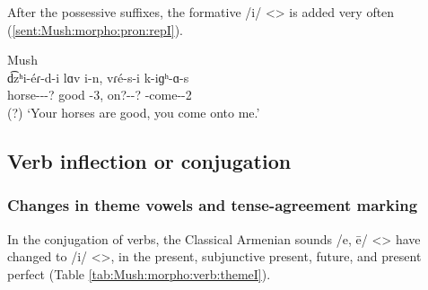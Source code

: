 After the possessive suffixes, the formative /i/ <> is added very often (\ref{sent:Mush:morpho:pron:repI}).

\begin{exe}
	\ex Mush \label{sent:Mush:morpho:pron:repI} \\ \gll 
	d͡zʰi-\'eɾ-d-i lɑv i-n, vɾ\'e-s-i k-iɡʰ-ɑ-s
	\\
	horse-{\pl}-{\possSsg}-? good {\aux}-3{\pl}, on?-{\possFsg}-? {\ind}-come-{\thgloss}-2{\sg}\\
	\trans (?)   `Your horses are good, you come onto me.' \\
\end{exe}

\subsection{Verb inflection or conjugation}

\subsubsection{Changes in theme vowels and tense-agreement marking}
In the conjugation of verbs, the Classical Armenian sounds /e, ē/ <> have changed to /i/ <>, in the present, subjunctive present, future, and present perfect (Table \ref{tab:Mush:morpho:verb:themeI}). 


